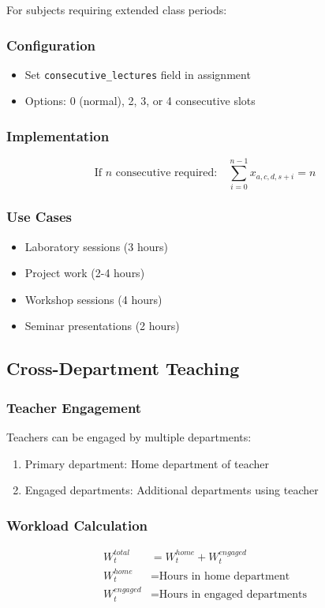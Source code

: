 \documentclass[12pt,a4paper]{article}
\begin{document}
For subjects requiring extended class periods:

\subsubsection{Configuration}
\begin{itemize}
    \item Set \texttt{consecutive\_lectures} field in assignment
    \item Options: 0 (normal), 2, 3, or 4 consecutive slots
\end{itemize}

\subsubsection{Implementation}
\begin{equation}
\text{If } n \text{ consecutive required:} \quad \sum_{i=0}^{n-1} x_{a,c,d,s+i} = n
\end{equation}

\subsubsection{Use Cases}
\begin{itemize}
    \item Laboratory sessions (3 hours)
    \item Project work (2-4 hours)
    \item Workshop sessions (4 hours)
    \item Seminar presentations (2 hours)
\end{itemize}

\subsection{Cross-Department Teaching}

\subsubsection{Teacher Engagement}
Teachers can be engaged by multiple departments:

\begin{enumerate}
    \item Primary department: Home department of teacher
    \item Engaged departments: Additional departments using teacher
\end{enumerate}

\subsubsection{Workload Calculation}
\begin{align}
W_t^{total} &= W_t^{home} + W_t^{engaged} \\
W_t^{home} &= \text{Hours in home department} \\
W_t^{engaged} &= \text{Hours in engaged departments}
\end{align}
\end{document}
